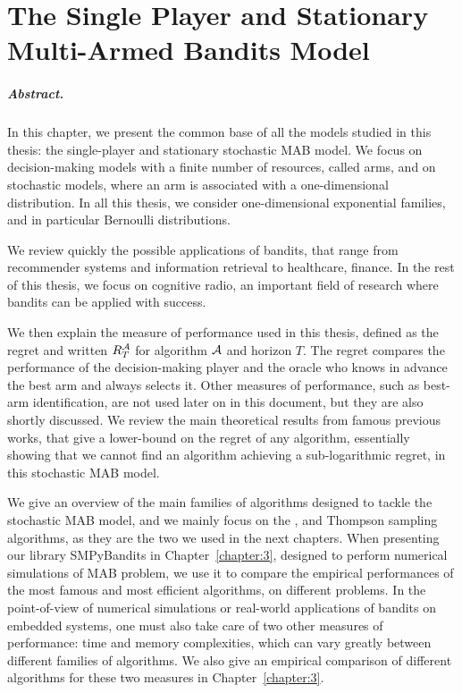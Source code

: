 
\chapter{The Single Player and Stationary Multi-Armed Bandits Model}
\label{chapter:2}
\minitoc


\paragraph{Abstract.}
%
In this chapter, we present the common base of all the models studied in this thesis:
the single-player and stationary stochastic MAB model.
We focus on decision-making models with a finite number of resources, called arms, and on stochastic models, where an arm is associated with a one-dimensional distribution.
In all this thesis, we consider one-dimensional exponential families, and in particular Bernoulli distributions.

We review quickly the possible applications of bandits, that range from recommender systems and information retrieval to healthcare, finance. In the rest of this thesis, we focus on cognitive radio, an important field of research where bandits can be applied with success.

We then explain the measure of performance used in this thesis, defined as the regret and written $R_T^{\mathcal{A}}$ for algorithm $\mathcal{A}$ and horizon $T$. The regret compares the performance of the decision-making player and the oracle who knows in advance the best arm and always selects it.
Other measures of performance, such as best-arm identification, are not used later on in this document, but they are also shortly discussed.
%
We review the main theoretical results from famous previous works, that give a lower-bound on the regret of any algorithm, essentially showing that we cannot find an algorithm achieving a sub-logarithmic regret, in this stochastic MAB model.

We give an overview of the main families of algorithms designed to tackle the stochastic MAB model, and we mainly focus on the \UCB, \klUCB{} and Thompson sampling algorithms, as they are the two we used in the next chapters.
When presenting our library SMPyBandits in Chapter~\ref{chapter:3}, designed to perform numerical simulations of MAB problem, we use it to compare the empirical performances of the most famous and most efficient algorithms, on different problems.
%
In the point-of-view of numerical simulations or real-world applications of bandits on embedded systems, one must also take care of two other measures of performance: time and memory complexities, which can vary greatly between different families of algorithms.
We also give an empirical comparison of different algorithms for these two measures in Chapter~\ref{chapter:3}.

